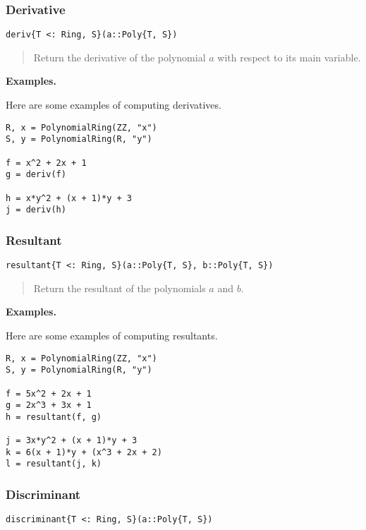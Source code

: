 \documentclass[a4paper,10pt]{article}
\newcommand{\desc}[1]{\vspace{-3mm}\begin{quote}#1\end{quote}}
\begin{document}
{{{\subsubsection{Derivative}

\begin{lstlisting}
deriv{T <: Ring, S}(a::Poly{T, S})
\end{lstlisting}

\desc{Return the derivative of the polynomial $a$ with respect to its main
variable.}

\textbf{Examples.}

Here are some examples of computing derivatives.

\begin{lstlisting}
R, x = PolynomialRing(ZZ, "x")
S, y = PolynomialRing(R, "y")

f = x^2 + 2x + 1
g = deriv(f)

h = x*y^2 + (x + 1)*y + 3
j = deriv(h)
\end{lstlisting}

\subsubsection{Resultant}

\begin{lstlisting}
resultant{T <: Ring, S}(a::Poly{T, S}, b::Poly{T, S})
\end{lstlisting}

\desc{Return the resultant of the polynomials $a$ and $b$.}

\textbf{Examples.}

Here are some examples of computing resultants.

\begin{lstlisting}
R, x = PolynomialRing(ZZ, "x")
S, y = PolynomialRing(R, "y")

f = 5x^2 + 2x + 1
g = 2x^3 + 3x + 1
h = resultant(f, g)

j = 3x*y^2 + (x + 1)*y + 3
k = 6(x + 1)*y + (x^3 + 2x + 2)
l = resultant(j, k)
\end{lstlisting}

\subsubsection{Discriminant}

\begin{lstlisting}
discriminant{T <: Ring, S}(a::Poly{T, S})
\end{lstlisting}

}}}
\end{document}
